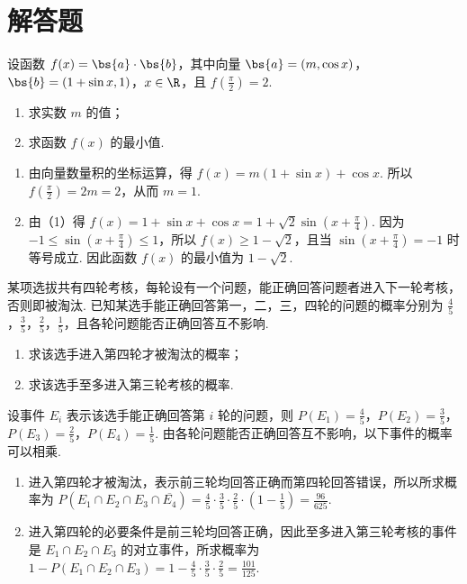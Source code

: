 \section{解答题}

\begin{problem}
设函数 \(f(x) = \bs{a} \cdot \bs{b}\)，其中向量 \(\bs{a} = (m, \cos x)\)，\(\bs{b} = (1 + \sin x, 1)\)，\(x \in \R\)，且 \(f\left(\frac{\pi}{2}\right) = 2\).

\begin{enumerate}
\item 求实数 \(m\) 的值；
\item 求函数 \(f(x)\) 的最小值.
\end{enumerate}
\end{problem}

\begin{solution}
\begin{enumerate}
\item 由向量数量积的坐标运算，得 \(f(x)=m\left(1+\sin x\right)+\cos x\). 所以 \(f\left(\frac{\pi}{2}\right)=2m=2\)，从而 \(m=1\).
\item 由（1）得 \(f(x)=1+\sin x+\cos x=1+\sqrt{2}\sin\left(x+\frac{\pi}{4}\right)\). 因为 \(-1\leqslant\sin\left(x+\frac{\pi}{4}\right)\leqslant1\)，所以 \(f(x)\geqslant1-\sqrt{2}\)，且当 \(\sin\left(x+\frac{\pi}{4}\right)=-1\) 时等号成立. 因此函数 \(f(x)\) 的最小值为 \(1-\sqrt{2}\).
\end{enumerate}
\end{solution}

\begin{problem}
某项选拔共有四轮考核，每轮设有一个问题，能正确回答问题者进入下一轮考核，否则即被淘汰. 已知某选手能正确回答第一，二，三，四轮的问题的概率分别为 \(\frac{4}{5}\)，\(\frac{3}{5}\)，\(\frac{2}{5}\)，\(\frac{1}{5}\)，且各轮问题能否正确回答互不影响.

\begin{enumerate}
\item 求该选手进入第四轮才被淘汰的概率；
\item 求该选手至多进入第三轮考核的概率.
\end{enumerate}
\end{problem}

\begin{solution}
设事件 \(E_i\) 表示该选手能正确回答第 \(i\) 轮的问题，则 \(P\left(E_1\right)=\frac45\)，\(P\left(E_2\right)=\frac35\)，\(P\left(E_3\right)=\frac25\)，\(P\left(E_4\right)=\frac15\). 由各轮问题能否正确回答互不影响，以下事件的概率可以相乘.

\begin{enumerate}
\item 进入第四轮才被淘汰，表示前三轮均回答正确而第四轮回答错误，所以所求概率为 \(P\left(E_1\cap E_2\cap E_3\cap\overline{E_4}\right)=\frac45\cdot\frac35\cdot\frac25\cdot\left(1-\frac15\right)=\frac{96}{625}\).
\item 进入第四轮的必要条件是前三轮均回答正确，因此至多进入第三轮考核的事件是 \(E_1\cap E_2\cap E_3\) 的对立事件，所求概率为 \(1-P\left(E_1\cap E_2\cap E_3\right)=1-\frac45\cdot\frac35\cdot\frac25=\frac{101}{125}\).
\end{enumerate}
\end{solution}

